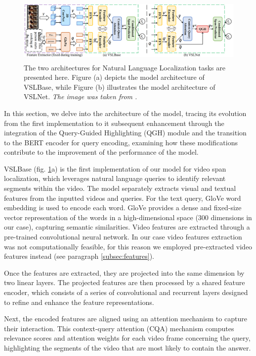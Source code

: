 \documentclass[10pt,twocolumn,letterpaper]{article}
\begin{document}
\begin{figure}
  \includegraphics[width=\textwidth,height=3.2cm]{VSLnet.png}
  \caption{The two architectures for Natural Language Localization tasks are presented here. Figure (a) depicts the model architecture of VSLBase, while Figure (b) illustrates the model architecture of VSLNet. \textit{The image was taken from \cite{b3}.}}
  \label{fig:VSL}
\end{figure}

In this section, we delve into the architecture of the model, tracing its evolution from the first implementation to it subsequent enhancement through the integration of the Query-Guided Highlighting (QGH) module and the transition to the BERT encoder for query encoding, examining how these modifications contribute to the improvement of the performance of the model.

VSLBase (fig. \ref{fig:VSL}a) is the first implementation of our model for video span localization, which leverages natural language queries to identify relevant segments within the video.  The model separately extracts visual and textual features from the inputted videos and queries. For the text query, GloVe word embedding is used to encode each word. GloVe provides a dense and fixed-size vector representation of the words in a high-dimensional space (300 dimensions in our case), capturing semantic similarities. Video features are extracted through a pre-trained convolutional neural network. In our case video features extraction was not computationally feasible, for this reason we employed pre-extracted video features instead (see paragraph \ref{subsec:features}). 

Once the features are extracted, they are projected into the same dimension by two linear layers. The projected features are then processed by a shared feature encoder, which consists of a series of convolutional and recurrent layers designed to refine and enhance the feature representations.

Next, the encoded features are aligned using an attention mechanism to capture their interaction. This context-query attention (CQA) mechanism computes relevance scores and attention weights for each video frame concerning the query, highlighting the segments of the video that are most likely to contain the answer.
\end{document}
